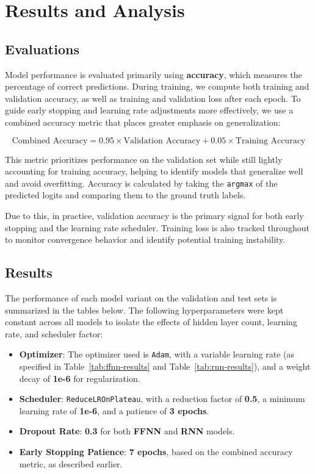 \documentclass[a4paper]{article}
\begin{document}
\section{Results and Analysis}


\subsection*{Evaluations}
Model performance is evaluated primarily using \textbf{accuracy}, which measures the percentage of correct predictions. During training, we compute both training and validation accuracy, as well as training and validation loss after each epoch. To guide early stopping and learning rate adjustments more effectively, we use a combined accuracy metric that places greater emphasis on generalization:

\[
\text{Combined Accuracy} = 0.95 \times \text{Validation Accuracy} + 0.05 \times \text{Training Accuracy}
\]

This metric prioritizes performance on the validation set while still lightly accounting for training accuracy, helping to identify models that generalize well and avoid overfitting. Accuracy is calculated by taking the \texttt{argmax} of the predicted logits and comparing them to the ground truth labels.

Due to this, in practice, validation accuracy is the primary signal for both early stopping and the learning rate scheduler. Training loss is also tracked throughout to monitor convergence behavior and identify potential training instability.


\subsection*{Results}

The performance of each model variant on the validation and test sets is summarized in the tables below. The following hyperparameters were kept constant across all models to isolate the effects of hidden layer count, learning rate, and scheduler factor:

\begin{itemize}
    \item \textbf{Optimizer}: The optimizer used is \texttt{Adam}, with a variable learning rate (as specified in Table~\ref{tab:ffnn-results} and Table~\ref{tab:rnn-results}), and a weight decay of \textbf{1e-6} for regularization.
    \item \textbf{Scheduler}: \texttt{ReduceLROnPlateau}, with a reduction factor of \textbf{0.5}, a minimum learning rate of \textbf{1e-6}, and a patience of \textbf{3 epochs}.
    \item \textbf{Dropout Rate}: \textbf{0.3} for both \textbf{FFNN} and \textbf{RNN} models.
    \item \textbf{Early Stopping Patience}: \textbf{7 epochs}, based on the combined accuracy metric, as described earlier.
\end{itemize}
\end{document}
